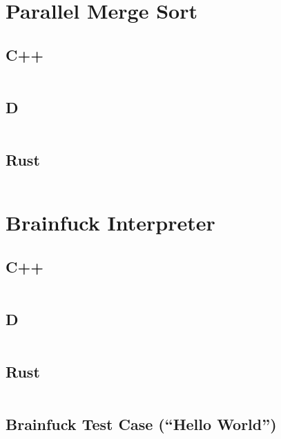 \documentclass[finalcopy]{srpaper}
\begin{document}
\section{Parallel Merge Sort}
\subsection{C++}
\begin{mdframed}[linecolor=black]
\inputminted[fontsize=\scriptsize]{cpp}{../examples/parallel-merge-sort/parallel_merge_sort.cpp}
\end{mdframed}

\subsection{D}
\begin{mdframed}[linecolor=black]
\inputminted[fontsize=\scriptsize]{d}{../examples/parallel-merge-sort/parallel_merge_sort.d}
\end{mdframed}

\subsection{Rust}
\begin{mdframed}[linecolor=black]
\inputminted[fontsize=\scriptsize]{rust}{../examples/parallel-merge-sort/parallel_merge_sort.rs}
\end{mdframed}

\section{Brainfuck Interpreter}

\subsection{C++}
\begin{mdframed}[linecolor=black]
\inputminted[fontsize=\scriptsize]{cpp}{../examples/brainfsck/brainfsck.cpp}
\end{mdframed}

\subsection{D}
\begin{mdframed}[linecolor=black]
\inputminted[fontsize=\scriptsize]{d}{../examples/brainfsck/brainfsck.d}
\end{mdframed}

\subsection{Rust}
\begin{mdframed}[linecolor=black]
\inputminted[fontsize=\scriptsize]{rust}{../examples/brainfsck/brainfsck.rs}
\end{mdframed}

\subsection{Brainfuck Test Case (``Hello World'')}
\begin{mdframed}[linecolor=black]
\inputminted[fontsize=\scriptsize]{brainfuck}{../examples/brainfsck/tests/hello.bf}
\end{mdframed}
\end{document}
